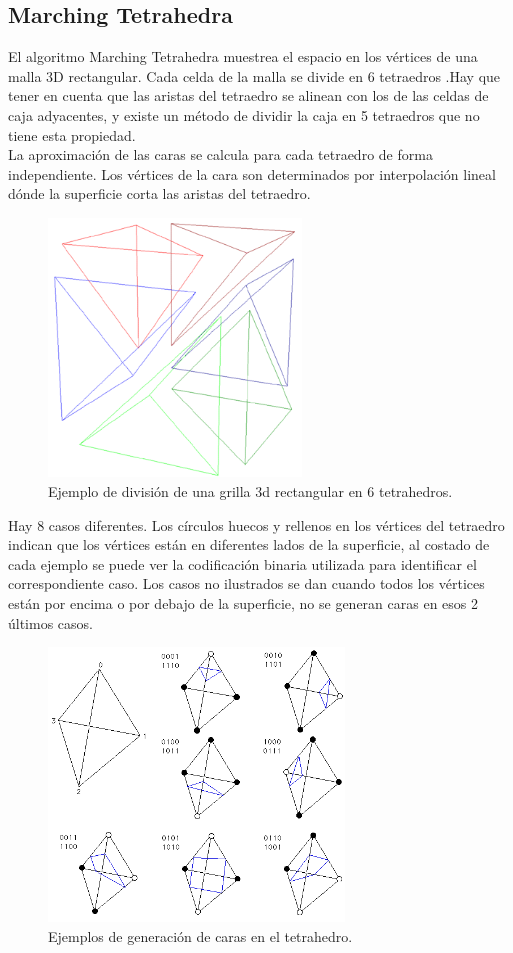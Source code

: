 \documentclass[12pt]{article}
\begin{document}
\subsection{Marching Tetrahedra}
El algoritmo Marching Tetrahedra\cite{marching}\cite{marchingt} muestrea el espacio en los vértices de una malla 3D rectangular. Cada celda de la malla se divide en 6 tetraedros .Hay que tener en cuenta que las aristas del tetraedro se alinean con los de las celdas de caja adyacentes, y existe un método de dividir la caja en 5 tetraedros que no tiene esta propiedad.
\\La aproximación de las caras se calcula para cada tetraedro de forma independiente. Los vértices de la cara son determinados por interpolación lineal dónde la superficie corta las aristas del tetraedro.
\begin{figure}[h!]
\includegraphics[width=0.6\textwidth,center]{mt1.png}
\caption{Ejemplo de división de una grilla 3d rectangular en 6 tetrahedros.}
\end{figure}
\clearpage
Hay 8 casos diferentes. Los círculos huecos y rellenos en los vértices del tetraedro indican que los vértices están en diferentes lados de la superficie, al costado de cada ejemplo se puede ver la codificación binaria utilizada para identificar el correspondiente caso. Los casos no ilustrados se dan cuando todos los vértices están por encima o por debajo de la superficie, no se generan caras en esos 2 últimos casos.\\
\begin{figure}[h!]
\includegraphics[width=0.7\textwidth,center]{mt2.png}
\caption{Ejemplos de generación de caras en el tetrahedro.}
\end{figure}\\
\end{document}
